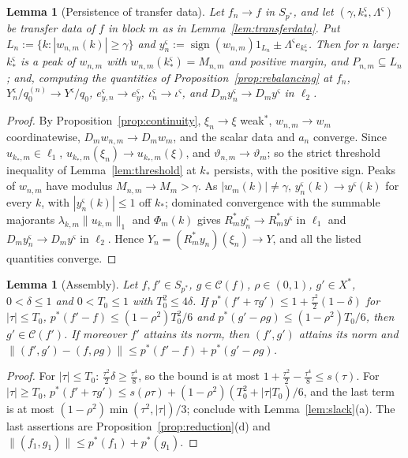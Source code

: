 \documentclass[10pt]{amsart}
\newtheorem{lemma}[theorem]{Lemma}
\theoremstyle{definition}
\theoremstyle{remark}
\newcommand{\sgn}{\operatorname{sign}}
\newcommand{\Cset}{\mathcal C}
\begin{document}
\begin{lemma}[Persistence of transfer data]\label{lem:persistence}
Let $f_n\to f$ in $S_{p^*}$, and let $(\gamma,k_*^\varsigma,\Lambda^\varsigma)$
be transfer data of $f$ in block $m$ as in Lemma~\ref{lem:transferdata}.  Put
$L_n:=\{k:|w_{n,m}(k)|\ge\gamma\}$ and $y_n^\varsigma:=\sgn(w_{n,m})1_{L_n}
\pm\Lambda^\varsigma e_{k^\varsigma_*}$.  Then for $n$ large: $k_*^\varsigma$
is a peak of $w_{n,m}$ with $w_{n,m}(k_*^\varsigma)=M_{n,m}$ and positive
margin, and $P_{n,m}\subseteq L_n$; and, computing the quantities of
Proposition~\ref{prop:rebalancing} at $f_n$,
$Y^\varsigma_n/q^{(n)}_0\to Y^\varsigma/q_0$, $e^\varsigma_{y,n}\to
e^\varsigma_y$, $\iota^\varsigma_n\to\iota^\varsigma$, and
$D_my^\varsigma_n\to D_my^\varsigma$ in $\ell_2$.
\end{lemma}

\begin{proof}
By Proposition~\ref{prop:continuity}, $\xi_n\to\xi$ weak$^*$, $w_{n,m}\to
w_m$ coordinatewise, $D_mw_{n,m}\to D_mw_m$, and the scalar data and $a_n$
converge.  Since $u_{k_*,m}\in\ell_1$, $u_{k_*,m}(\xi_n)\to u_{k_*,m}(\xi)$,
and $\vartheta_{n,m}\to\vartheta_m$; so the strict threshold inequality of
Lemma~\ref{lem:threshold} at $k_*$ persists, with the positive sign.  Peaks
of $w_{n,m}$ have modulus $M_{n,m}\to M_m>\gamma$.  As $|w_m(k)|\ne\gamma$,
$y^\varsigma_n(k)\to y^\varsigma(k)$ for every $k$, with $|y_n^\varsigma(k)|\le1$
off $k_*$; dominated convergence with the summable majorants
$\lambda_{k,m}\|u_{k,m}\|_1$ and $\Phi_m(k)$ gives
$R_m^*y_n^\varsigma\to R_m^*y^\varsigma$ in $\ell_1$ and
$D_my^\varsigma_n\to D_my^\varsigma$ in $\ell_2$.  Hence
$Y_n=(R_m^*y_n)(\xi_n)\to Y$, and all the listed quantities converge.
\end{proof}

\begin{lemma}[Assembly]\label{lem:assembly}
Let $f,f'\in S_{p^*}$, $g\in\Cset(f)$, $\rho\in(0,1)$, $g'\in X^*$,
$0<\delta\le1$ and $0<T_0\le1$ with $T_0^2\le4\delta$.  If
$p^*(f'+\tau g')\le1+\frac{\tau^2}2(1-\delta)$ for $|\tau|\le T_0$,
$p^*(f'-f)\le(1-\rho^2)T_0^2/6$ and $p^*(g'-\rho g)\le(1-\rho^2)T_0/6$, then
$g'\in\Cset(f')$.  If moreover $f'$ attains its norm, then $(f',g')$
attains its norm and $\|(f',g')-(f,\rho g)\|\le p^*(f'-f)+p^*(g'-\rho g)$.
\end{lemma}

\begin{proof}
For $|\tau|\le T_0$: $\frac{\tau^2}2\delta\ge\frac{\tau^4}8$, so the bound is
at most $1+\frac{\tau^2}2-\frac{\tau^4}8\le s(\tau)$.  For $|\tau|\ge T_0$,
$p^*(f'+\tau g')\le s(\rho\tau)+(1-\rho^2)(T_0^2+|\tau|T_0)/6$, and the last
term is at most $(1-\rho^2)\min(\tau^2,|\tau|)/3$; conclude with
Lemma~\ref{lem:slack}(a).  The last assertions are
Proposition~\ref{prop:reduction}(d) and $\|(f_1,g_1)\|\le p^*(f_1)+p^*(g_1)$.
\end{proof}
\end{document}

